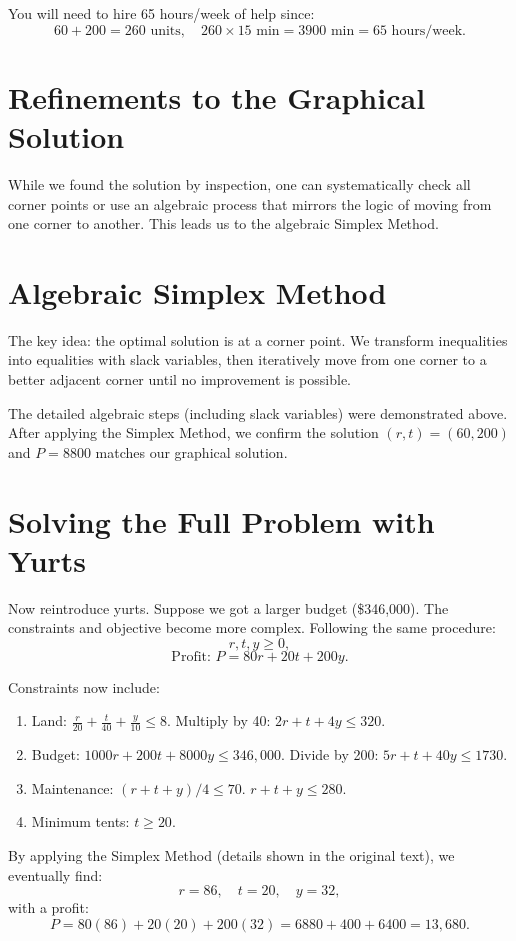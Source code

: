 You will need to hire 65 hours/week of help since:
\[
60 + 200 = 260 \text{ units}, \quad 260 \times 15\text{ min} = 3900 \text{ min} = 65\text{ hours/week}.
\]

\section{Refinements to the Graphical Solution}
While we found the solution by inspection, one can systematically check all corner points or use an algebraic process that mirrors the logic of moving from one corner to another. This leads us to the algebraic Simplex Method.

\section{Algebraic Simplex Method}
The key idea: the optimal solution is at a corner point. We transform inequalities into equalities with slack variables, then iteratively move from one corner to a better adjacent corner until no improvement is possible.

The detailed algebraic steps (including slack variables) were demonstrated above. After applying the Simplex Method, we confirm the solution $(r,t)=(60,200)$ and $P=8800$ matches our graphical solution.

\section{Solving the Full Problem with Yurts}
Now reintroduce yurts. Suppose we got a larger budget (\$346,000). The constraints and objective become more complex. Following the same procedure:
\[
r,t,y \geq 0,
\]
\[
\text{Profit: } P = 80r + 20t + 200y.
\]

Constraints now include:
\begin{enumerate}
    \item Land: $\frac{r}{20} + \frac{t}{40} + \frac{y}{10} \leq 8$.  
    Multiply by 40: $2r + t + 4y \leq 320$.
    \item Budget: $1000r + 200t + 8000y \leq 346{,}000$.  
    Divide by 200: $5r + t + 40y \leq 1730$.
    \item Maintenance: $(r + t + y)/4 \leq 70$.  
    $r + t + y \leq 280$.
    \item Minimum tents: $t \geq 20$.
\end{enumerate}

By applying the Simplex Method (details shown in the original text), we eventually find:
\[
r = 86, \quad t = 20, \quad y = 32,
\]
with a profit:
\[
P = 80(86) + 20(20) + 200(32) = 6880 + 400 + 6400 = 13{,}680.
\]


